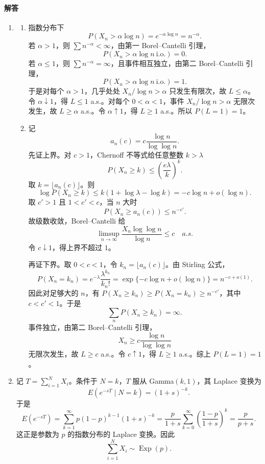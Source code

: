 \documentclass[UTF8,12pt]{ctexart}
\begin{document}
\paragraph{解答}
\begin{enumerate}[label=\textbf{\arabic*.},leftmargin=2.2em]
\item
\begin{enumerate}[label=\textbf{(\arabic*)},leftmargin=2.4em]
\item 指数分布下
\[
P(X_n>\alpha\log n)=e^{-\alpha\log n}=n^{-\alpha}.
\]
若 \(\alpha>1\)，则 \(\sum n^{-\alpha}<\infty\)，由第一 Borel--Cantelli 引理，
\[
P(X_n>\alpha\log n\ \text{i.o.})=0.
\]
若 \(\alpha\le1\)，则 \(\sum n^{-\alpha}=\infty\)，且事件相互独立，由第二 Borel--Cantelli 引理，
\[
P(X_n>\alpha\log n\ \text{i.o.})=1.
\]
于是对每个 \(\alpha>1\)，几乎处处 \(X_n/\log n>\alpha\) 只发生有限次，故 \(L\le\alpha\)。令 \(\alpha\downarrow1\)，得 \(L\le1\) a.s.。对每个 \(0<\alpha<1\)，事件 \(X_n/\log n>\alpha\) 无限次发生，故 \(L\ge\alpha\) a.s.。令 \(\alpha\uparrow1\)，得 \(L\ge1\) a.s.。所以 \(P(L=1)=1\)。
\item 记
\[
a_n(c)=c\frac{\log n}{\log\log n}.
\]
先证上界。对 \(c>1\)，Chernoff 不等式给任意整数 \(k>\lambda\)
\[
P(X_n\ge k)\le \left(\frac{e\lambda}{k}\right)^k.
\]
取 \(k=\lfloor a_n(c)\rfloor\)。则
\[
\log P(X_n\ge k)
\le k(1+\log\lambda-\log k)
=-c\log n+o(\log n).
\]
取 \(c'>1\) 且 \(1<c'<c\)，当 \(n\) 大时
\[
P(X_n\ge a_n(c))\le n^{-c'}.
\]
故级数收敛，Borel--Cantelli 给
\[
\limsup_{n\to\infty}\frac{X_n\log\log n}{\log n}\le c\quad a.s.
\]
令 \(c\downarrow1\)，得上界不超过 \(1\)。

再证下界。取 \(0<c<1\)，令 \(k_n=\lfloor a_n(c)\rfloor\)。由 Stirling 公式，
\[
P(X_n=k_n)=e^{-\lambda}\frac{\lambda^{k_n}}{k_n!}
=\exp\{-c\log n+o(\log n)\}=n^{-c+o(1)}.
\]
因此对足够大的 \(n\)，有 \(P(X_n\ge k_n)\ge P(X_n=k_n)\ge n^{-c'}\)，其中 \(c<c'<1\)。于是
\[
\sum_n P(X_n\ge k_n)=\infty.
\]
事件独立，由第二 Borel--Cantelli 引理，
\[
X_n\ge c\frac{\log n}{\log\log n}
\]
无限次发生，故 \(L\ge c\) a.s.。令 \(c\uparrow1\)，得 \(L\ge1\) a.s.。综上 \(P(L=1)=1\)。
\end{enumerate}

\item 记 \(T=\sum_{i=1}^N X_i\)。条件于 \(N=k\)，\(T\) 服从 Gamma\((k,1)\)，其 Laplace 变换为
\[
E(e^{-sT}\mid N=k)=(1+s)^{-k}.
\]
于是
\[
E(e^{-sT})
=\sum_{k=1}^\infty p(1-p)^{k-1}(1+s)^{-k}
=\frac{p}{1+s}\sum_{k=0}^\infty\left(\frac{1-p}{1+s}\right)^k
=\frac{p}{p+s}.
\]
这正是参数为 \(p\) 的指数分布的 Laplace 变换。因此
\[
\sum_{i=1}^N X_i\sim \operatorname{Exp}(p).
\]


\end{enumerate}
\end{document}
